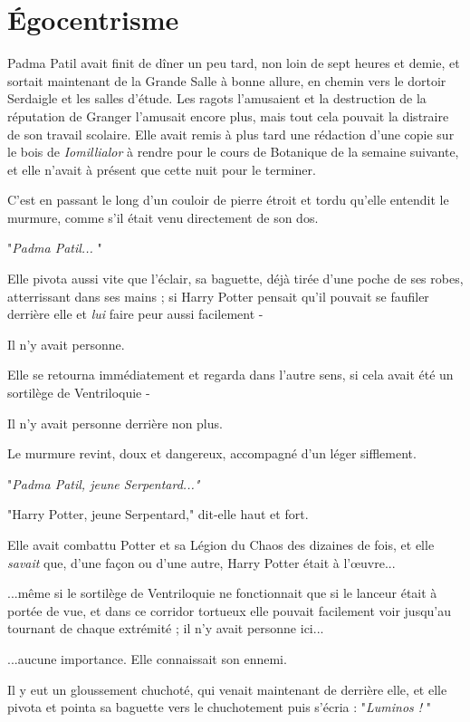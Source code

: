 
\chapter{Égocentrisme}

Padma Patil avait finit de dîner un peu tard, non loin de sept heures et demie, et sortait maintenant de la Grande Salle à bonne allure, en chemin vers le dortoir Serdaigle et les salles d'étude. Les ragots l'amusaient et la destruction de la réputation de Granger l'amusait encore plus, mais tout cela pouvait la distraire de son travail scolaire. Elle avait remis à plus tard une rédaction d'une copie sur le bois de \emph{Iomillialor}  à rendre pour le cours de Botanique de la semaine suivante, et elle n'avait à présent que cette nuit pour le terminer.

C'est en passant le long d'un couloir de pierre étroit et tordu qu'elle entendit le murmure, comme s'il était venu directement de son dos.

"\emph{Padma Patil...} "

Elle pivota aussi vite que l'éclair, sa baguette, déjà tirée d'une poche de ses robes, atterrissant dans ses mains ; si Harry Potter pensait qu'il pouvait se faufiler derrière elle et \emph{lui}  faire peur aussi facilement -

Il n'y avait personne.

Elle se retourna immédiatement et regarda dans l'autre sens, si cela avait été un sortilège de Ventriloquie -

Il n'y avait personne derrière non plus.

Le murmure revint, doux et dangereux, accompagné d'un léger sifflement.

"\emph{Padma Patil, jeune Serpentard..."} 

"Harry Potter, jeune Serpentard," dit-elle haut et fort.

Elle avait combattu Potter et sa Légion du Chaos des dizaines de fois, et elle \emph{savait}  que, d'une façon ou d'une autre, Harry Potter était à l'œuvre...

...même si le sortilège de Ventriloquie ne fonctionnait que si le lanceur était à portée de vue, et dans ce corridor tortueux elle pouvait facilement voir jusqu'au tournant de chaque extrémité ; il n'y avait personne ici...

...aucune importance. Elle connaissait son ennemi.

Il y eut un gloussement chuchoté, qui venait maintenant de derrière elle, et elle pivota et pointa sa baguette vers le chuchotement puis s'écria : "\emph{Luminos !} "

